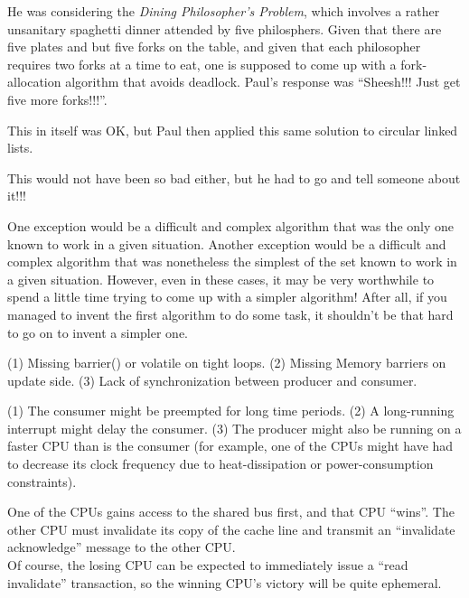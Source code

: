 	He was considering the \emph{Dining Philosopher's Problem}, which
	involves a rather unsanitary spaghetti dinner attended by
	five philosphers.
	Given that there are five plates and but five forks on the table, and
	given that each philosopher requires two forks at a time to eat,
	one is supposed to come up with a fork-allocation algorithm that
	avoids deadlock.
	Paul's response was ``Sheesh!!!  Just get five more forks!!!''.

	This in itself was OK, but Paul then applied this same solution to
	circular linked lists.

	This would not have been so bad either, but he had to go and tell
	someone about it!!!


	One exception would be a difficult and complex algorithm that
	was the only one known to work in a given situation.
	Another exception would be a difficult and complex algorithm
	that was nonetheless the simplest of the set known to work in
	a given situation.
	However, even in these cases, it may be very worthwhile to spend
	a little time trying to come up with a simpler algorithm!
	After all, if you managed to invent the first algorithm
	to do some task, it shouldn't be that hard to go on to
	invent a simpler one.


(1)	Missing barrier() or volatile on tight loops.
(2)	Missing Memory barriers on update side.
(3)	Lack of synchronization between producer and consumer.


(1)	The consumer might be preempted for long time periods.
(2)	A long-running interrupt might delay the consumer.
(3)	The producer might also be running on a faster CPU than is the
	consumer (for example, one of the CPUs might have had to decrease its
	clock frequency due to heat-dissipation or power-consumption
	constraints).

One of the CPUs gains access
to the shared bus first,
and that CPU ``wins''.  The other CPU must invalidate its copy of the
cache line and transmit an ``invalidate acknowledge'' message
to the other CPU. \\
Of course, the losing CPU can be expected to immediately issue a
``read invalidate'' transaction, so the winning CPU's victory will
be quite ephemeral.

